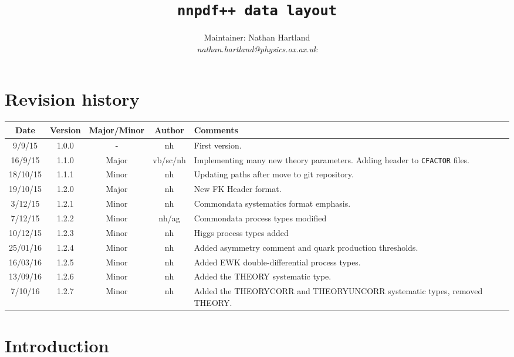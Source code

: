 \documentclass[11pt]{article}
\title{\tt{nnpdf++} data layout}
\author{Maintainer: Nathan Hartland\\ {\it nathan.hartland@physics.ox.ax.uk }}
\begin{document}
\maketitle
\tableofcontents
\clearpage
\section{Revision history}

\begin{table}[htp]
\begin{center}
\begin{tabular}{|c|c|c|c|p{50mm}|}
\hline
Date & Version & Major/Minor & Author & Comments\\
\hline\hline
9/9/15 & 1.0.0 & - & nh & First version.\\
\hline
16/9/15 & 1.1.0 & Major & vb/sc/nh & Implementing many \newline new theory parameters. \newline Adding header to {\tt CFACTOR} files.\\
\hline
18/10/15 & 1.1.1 & Minor & nh & Updating paths after move to git repository. \\
\hline
19/10/15 & 1.2.0 & Major & nh & New FK Header format. \\
\hline
3/12/15 & 1.2.1 & Minor & nh & Commondata systematics format emphasis. \\
\hline
7/12/15 & 1.2.2 & Minor & nh/ag & Commondata process types modified \\
\hline
10/12/15 & 1.2.3 & Minor & nh & Higgs process types added \\
\hline
25/01/16 & 1.2.4 & Minor & nh & Added asymmetry comment and quark production thresholds. \\
\hline
16/03/16 & 1.2.5 & Minor & nh & Added EWK double-differential process types. \\
\hline
13/09/16 & 1.2.6 & Minor & nh & Added the THEORY systematic type. \\
\hline
7/10/16 & 1.2.7 & Minor & nh & Added the THEORYCORR and THEORYUNCORR systematic types, removed THEORY. \\
\hline
\end{tabular}
\end{center}
\label{tab:revsum}
\end{table}%

\clearpage

\section{Introduction}
\end{document}
